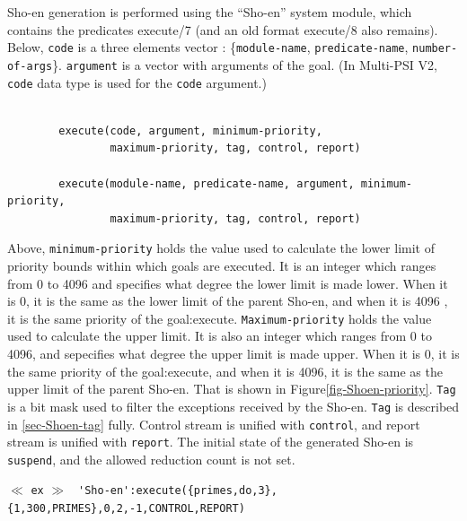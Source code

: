 Sho-en generation is performed using the ``Sho-en'' system module,
 which contains the predicates execute/7
(and an old format execute/8 also remains).
Below, \verb|code| is a three elements vector : 
\{\verb|module-name|, \verb|predicate-name|, \verb|number-of-args|\}.
\verb|argument| is a vector with arguments of the goal.
(In Multi-PSI V2, \verb|code| data type is used for the \verb|code|
argument.)
\begin{verbatim}

        execute(code, argument, minimum-priority,
                maximum-priority, tag, control, report)

        execute(module-name, predicate-name, argument, minimum-priority,
                maximum-priority, tag, control, report)

\end{verbatim}
Above, \verb|minimum-priority| holds the value used 
to calculate the lower limit of priority bounds 
within which goals are executed.
It is an integer which ranges from 0 to 4096 and specifies 
what degree the lower limit is made lower.
When it is 0, it is the same as the lower limit of the  parent Sho-en,
and when it is 4096 , it is the same priority of the goal:execute.
\verb|Maximum-priority| holds the value
used to calculate the upper limit.
It is also an integer which ranges from 0 to 4096, and sepecifies 
what degree the upper limit is made upper.
When it is 0, it is the same priority of the goal:execute,
and when it is 4096, it is the same as the upper limit of the parent Sho-en.
That is shown in Figure\ref{fig-Shoen-priority}.
\verb|Tag| is a bit mask
used to filter the exceptions received by the Sho-en. 
\verb|Tag| is described in \ref{sec-Shoen-tag} fully. 
Control stream is unified with \verb|control|, 
and report stream is unified with \verb|report|.
The initial state of the generated Sho-en is \verb|suspend|, and the allowed
reduction count is not set.\vspace{1ex}

$\ll$ \verb|ex| $\gg$
\verb| 'Sho-en':execute({primes,do,3},{1,300,PRIMES},0,2,-1,CONTROL,REPORT)|

